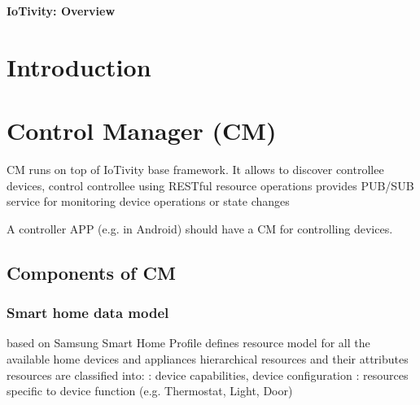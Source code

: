 \documentclass{myproc}
\begin{document}
\small


\begin{center}
{\large\bf IoTivity: Overview}
\end{center}

\vspace*{1cm}

\tableofcontents


\section{Introduction}

\section{Control Manager (CM)}
CM runs on top of IoTivity base framework.
It allows to
\bit
\w discover controllee devices,
\w control controllee using RESTful resource operations
\w provides PUB/SUB service for monitoring device operations or state changes
\eit

A controller APP (e.g. in Android) should have a CM for controlling devices. 

\subsection{Components of CM}
\subsubsection{Smart home data model}
\bit
\w based on Samsung Smart Home Profile
\w defines resource model for all the available home devices and appliances
\w hierarchical resources and their attributes
\w resources are classified into:
  \bit
  \w {}: device capabilities, device configuration
  \w {}: resources specific to device function (e.g. Thermostat, Light, Door)
  \eit
\eit
\end{document}
